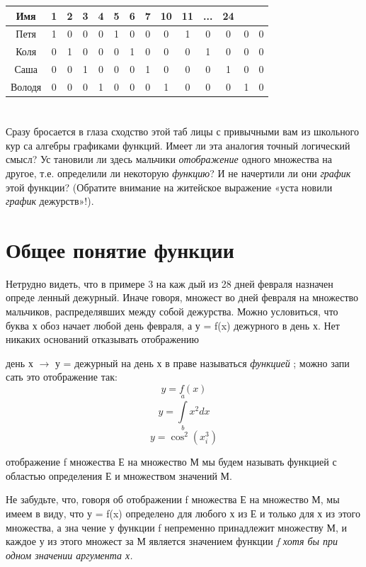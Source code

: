 \newpage

\begin{multicols}{2}
\setcounter{page}{2}
\begin{tabular}{|*{14}{c|}}
\hline
   Имя  & 1 & 2 & 3 & 4 & 5 & 6 & 7 & 10 & 11 & ... & 24\\
  \hline
  Петя & 1 & 0 & 0 & 0 & 1 & 0 & 0 & 0 & 1 & 0 & 0 & 0 & 0\\
  \hline
  Коля & 0 & 1 & 0 & 0 & 0 & 1 & 0 & 0 & 0 & 1 & 0 & 0 & 0\\
  \hline
  Саша & 0 & 0 & 1 & 0 & 0 & 0 & 1 & 0 & 0 & 0 & 1 & 0 & 0\\
  \hline
  Володя & 0 & 0 & 0 & 1 & 0 & 0 & 0 & 1 & 0 & 0 & 0 & 1 & 0\\ 
 \hline
\end{tabular}
\section*{}
Сразу бросается в глаза сходство этой таб
лицы с привычными вам из школьного кур
са алгебры графиками функций. Имеет ли
эта аналогия точный логический смысл? Ус
тановили ли здесь мальчики { \em отображение}
одного множества на другое, т.е. определили 
ли некоторую { \em функцию}? И не начертили
ли они {\em график} этой функции? (Обратите
внимание на житейское выражение «уста
новили { \em график} дежурств»!).
\section*{Общее понятие функции} 
Нетрудно видеть, что в примере 3 на каж
дый из 28 дней февраля назначен опреде
ленный дежурный. Иначе говоря, множест
во дней февраля {} на множество
мальчиков, распределявших между собой дежурства. 
Можно условиться, что буква х обоз
начает любой день февраля, а у = f(x)  
дежурного в день х. Нет никаких оснований
отказывать отображению

день х $\rightarrow$ у = дежурный на день х
в праве называться {\em функцией} ; можно запи
сать это отображение так:
$$y = f(x)$$
$$y = \int\limits^a_b x^2dx$$
$$y = \cos^2(x^3_{i})$$
 
{  отображение f множества Е на
множество М мы будем называть функцией
с областью определения Е и множеством
значений М.}

Не забудьте, что, говоря об отображении f
множества Е на множество М, мы имеем в
виду, что у = f(x) определено для любого х
из Е и только для х из этого множества, а зна
чение у функции f непременно принадлежит
множеству М, и каждое у из этого множест
за М является значением функции {\em f хотя
бы при одном значении аргумента х.}


\end{multicols}
